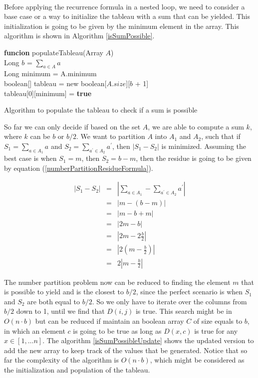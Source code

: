 \documentclass[tikz, 12pt]{scrartcl}
\begin{document}
\\
Before applying the recurrence formula in a nested loop, we need to consider a base case or a way to initialize the tableau with a sum that can be yielded. This initialization is going to be given by the minimum element in the array. This algorithm is shown in Algorithm \ref{isSumPossible}.

\begin{algorithm}[th!]
	{\bf funcion} populateTableau(Array $A$)\\
	Long $b$ = $\sum_{a \in A}a$\\
	Long minimum = A.minimum\\
	boolean[] tableau = new boolean[$A.size$][$b$ + 1]\\
	tableau[0][minimum] = \textbf{true}  
\caption{Algorithm to populate the tableau to check if a sum is possible}
\label{isSumPossible}
\end{algorithm}

So far we can only decide if based on the set $A$, we are able to compute a sum $k$, where $k$ can be $b$ or $b/2$. We want to partition $A$ into $A_1$ and $A_2$, such that if $S_1 = \sum_{a \in A_1} a$ and $S_2 = \sum_{a^{\prime} \in A_2} a^{\prime}$, then $|S_1 - S_2|$ is minimized. Assuming the best case is when $S_1 = m$, then $S_2 = b - m$, then the residue is going to be given by equation (\ref{numberPartitionResidueFormula}).

\begin{eqnarray}
|S_1 - S_2|	&	=	&	|\sum_{a \in A_1} - \sum_{a^{\prime} \in A_2} a^{\prime}| \nonumber \\
				&	=	&	|m - (b - m)| \nonumber \\
				&	=	&	|m - b + m| \nonumber \\
				&	=	&	|2m - b| \nonumber \\
				&	=	&	|2m - 2 \frac{b}{2}| \nonumber \\
				&	=	&	\left|2\left(m - \frac{b}{2} \right)\right| \nonumber \\
				&	=	&	2\left|m - \frac{b}{2}\right| \label{numberPartitionResidueFormula}
\end{eqnarray}

The number partition problem now can be reduced to finding the element $m$ that is possible to yield and is the closest to $b/2$, since the perfect scenario is when $S_1$ and $S_2$ are both equal to $b/2$. So we only have to iterate over the columns from $b/2$ down to 1, until we find that $D(i,j)$ is true. This search might be in $O(n \cdot b)$ but can be reduced if maintain an boolean array $C$ of size equals to $b$, in which an element $c$ is going to be true as long as $D(x, c)$ is true for any $x \in [1, \ldots n]$. The algorithm \ref{isSumPossibleUpdate} shows the updated version to add the new array to keep track of the values that be generated. Notice that so far the complexity of the algorithm is $O(n \cdot b)$, which might be considered as the initialization and population of the tableau.
\end{document}

